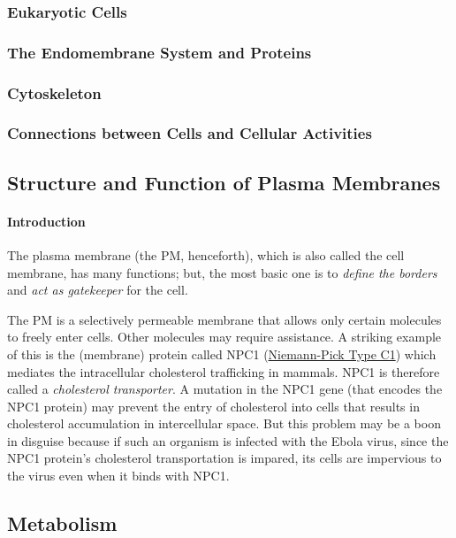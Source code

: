 \documentclass[12pt]{article}
\begin{document}
\subsubsection{Eukaryotic Cells}
\subsubsection{The Endomembrane System and Proteins}
\subsubsection{Cytoskeleton}
\subsubsection{Connections between Cells and Cellular Activities}


\subsection{Structure and Function of Plasma Membranes}
\paragraph{Introduction}
The plasma membrane (the PM, henceforth), which is also called the cell membrane, has many functions; but, the most basic one is to \emph{define the borders} and \emph{act as gatekeeper} for the cell.

The PM is a selectively permeable membrane that allows only certain molecules to freely enter cells. Other molecules may require assistance. A striking example of this is the (membrane) protein called NPC1 (\href{https://en.wikipedia.org/wiki/NPC1}{Niemann-Pick Type C1}) which mediates the intracellular cholesterol trafficking in mammals. NPC1 is therefore called a \emph{cholesterol transporter}. A mutation in the NPC1 gene (that encodes the NPC1 protein) may prevent the entry of cholesterol into cells that results in cholesterol accumulation in intercellular space. But this problem may be a boon in disguise because if such an organism is infected with the Ebola virus, since the NPC1 protein's cholesterol transportation is impared, its cells are impervious to the virus even when it binds with NPC1.

\subsection{Metabolism}
\end{document}
